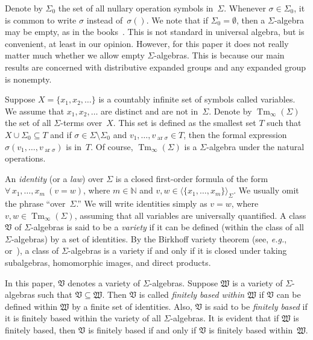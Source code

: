 \documentclass{jgcc}
\DeclareMathOperator{\ar}{ar}
\DeclareMathOperator{\Tm}{Tm}
\newcommand{\cl}{\mathfrak}
\newcommand{\alg}[1]{\langle#1\rangle}
\newcommand{\N}{\mathbb N}
\newcommand{\Forall}[1]{\forall\,#1\ }
\newcommand{\eg}{\emph{e.g.}}
\begin{document}
Denote by $\Sigma_0$ the set of all nullary operation
symbols in~$\Sigma$. Whenever $\sigma\in\Sigma_0$, it is
common to write $\sigma$ instead of~$\sigma()$. We note that
if $\Sigma_0=\emptyset$, then a $\Sigma$-algebra may be
empty, as in the books~\cite{Cohn81, Wech92}. This is not
standard in universal algebra, but is convenient, at least
in our opinion. However, for this paper it does not really
matter much whether we allow empty $\Sigma$-algebras. This
is because our main results are concerned with distributive
expanded groups and any expanded group is nonempty.

Suppose $X=\{x_1,x_2,\dotsc\}$ is a countably infinite set
of symbols called variables. We assume that $x_1,x_2,\dotsc$
are distinct and are not in~$\Sigma$. Denote by
$\Tm_\infty(\Sigma)$ the set of all $\Sigma$-terms over~$X$.
This set is defined as the smallest set $T$ such that
$X\cup\Sigma_0\subseteq T$ and if
$\sigma\in\Sigma\setminus\Sigma_0$ and
$v_1,\dots,v_{\ar\sigma}\in T$, then the formal expression
$\sigma(v_1,\dots,v_{\ar\sigma})$ is in~$T$. Of course,
$\Tm_\infty(\Sigma)$ is a $\Sigma$-algebra under the natural
operations.

An \emph{identity} (or a \emph{law}) over $\Sigma$ is a
closed first-order formula of the form
$\Forall{x_1,\dots,x_m}(v=w)$, where $m\in\N$ and
$v,w\in\alg{\{x_1,\dots,x_m\}}_\Sigma$. We usually omit the
phrase ``over~$\Sigma$.'' We will write identities simply as
$v=w$, where $v,w\in\Tm_\infty(\Sigma)$, assuming that all
variables are universally quantified. A class $\cl V$ of
$\Sigma$-algebras is said to be a \emph{variety} if it can
be defined (within the class of all $\Sigma$-algebras) by a
set of identities. By the Birkhoff variety theorem (see,
\eg,~\cite[Chapter~IV, Theorem~3.1]{Cohn81}
or~\cite[Subsection~3.2.3, Theorem~21]{Wech92}), a class of
$\Sigma$-algebras is a variety if and only if it is closed
under taking subalgebras, homomorphic images, and direct
products.

In this paper, $\cl V$ denotes a variety of
$\Sigma$-algebras. Suppose $\cl W$ is a variety of
$\Sigma$-algebras such that $\cl V\subseteq\cl W$. Then $\cl
V$ is called \emph{finitely based within $\cl W$} if $\cl V$
can be defined within $\cl W$ by a finite set of identities.
Also, $\cl V$ is said to be \emph{finitely based} if it is
finitely based within the variety of all $\Sigma$-algebras.
It is evident that if $\cl W$ is finitely based, then $\cl
V$ is finitely based if and only if $\cl V$ is finitely
based within~$\cl W$.
\end{document}

